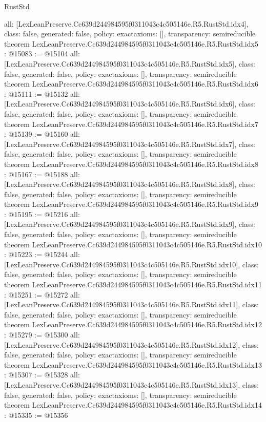 \begin{lexlean}{RustStd}
\begin{coremodule}
{  all: [LexLeanPreserve.Cc639d244984595f0311043c4c505146e.R5.RustStd.idx4],
  class: false,
  generated: false,
  policy: exact{axioms: []},
  transparency: semireducible
}
theorem LexLeanPreserve.Cc639d244984595f0311043c4c505146e.R5.RustStd.idx5 : @15083 := @15104 {
  all: [LexLeanPreserve.Cc639d244984595f0311043c4c505146e.R5.RustStd.idx5],
  class: false,
  generated: false,
  policy: exact{axioms: []},
  transparency: semireducible
}
theorem LexLeanPreserve.Cc639d244984595f0311043c4c505146e.R5.RustStd.idx6 : @15111 := @15132 {
  all: [LexLeanPreserve.Cc639d244984595f0311043c4c505146e.R5.RustStd.idx6],
  class: false,
  generated: false,
  policy: exact{axioms: []},
  transparency: semireducible
}
theorem LexLeanPreserve.Cc639d244984595f0311043c4c505146e.R5.RustStd.idx7 : @15139 := @15160 {
  all: [LexLeanPreserve.Cc639d244984595f0311043c4c505146e.R5.RustStd.idx7],
  class: false,
  generated: false,
  policy: exact{axioms: []},
  transparency: semireducible
}
theorem LexLeanPreserve.Cc639d244984595f0311043c4c505146e.R5.RustStd.idx8 : @15167 := @15188 {
  all: [LexLeanPreserve.Cc639d244984595f0311043c4c505146e.R5.RustStd.idx8],
  class: false,
  generated: false,
  policy: exact{axioms: []},
  transparency: semireducible
}
theorem LexLeanPreserve.Cc639d244984595f0311043c4c505146e.R5.RustStd.idx9 : @15195 := @15216 {
  all: [LexLeanPreserve.Cc639d244984595f0311043c4c505146e.R5.RustStd.idx9],
  class: false,
  generated: false,
  policy: exact{axioms: []},
  transparency: semireducible
}
theorem LexLeanPreserve.Cc639d244984595f0311043c4c505146e.R5.RustStd.idx10 : @15223 := @15244 {
  all: [LexLeanPreserve.Cc639d244984595f0311043c4c505146e.R5.RustStd.idx10],
  class: false,
  generated: false,
  policy: exact{axioms: []},
  transparency: semireducible
}
theorem LexLeanPreserve.Cc639d244984595f0311043c4c505146e.R5.RustStd.idx11 : @15251 := @15272 {
  all: [LexLeanPreserve.Cc639d244984595f0311043c4c505146e.R5.RustStd.idx11],
  class: false,
  generated: false,
  policy: exact{axioms: []},
  transparency: semireducible
}
theorem LexLeanPreserve.Cc639d244984595f0311043c4c505146e.R5.RustStd.idx12 : @15279 := @15300 {
  all: [LexLeanPreserve.Cc639d244984595f0311043c4c505146e.R5.RustStd.idx12],
  class: false,
  generated: false,
  policy: exact{axioms: []},
  transparency: semireducible
}
theorem LexLeanPreserve.Cc639d244984595f0311043c4c505146e.R5.RustStd.idx13 : @15307 := @15328 {
  all: [LexLeanPreserve.Cc639d244984595f0311043c4c505146e.R5.RustStd.idx13],
  class: false,
  generated: false,
  policy: exact{axioms: []},
  transparency: semireducible
}
theorem LexLeanPreserve.Cc639d244984595f0311043c4c505146e.R5.RustStd.idx14 : @15335 := @15356 {
}
\end{coremodule}
\end{lexlean}
